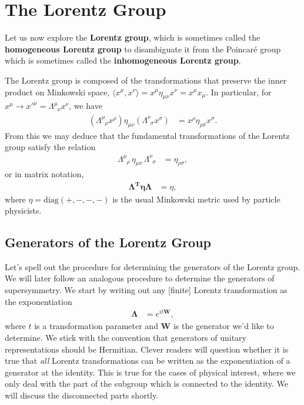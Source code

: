 \section{The Lorentz Group}

Let us now explore the \textbf{Lorentz group}, which is sometimes called the \textbf{homogeneous Lorentz group} to disambiguate it from the Poincar\'e group which is sometimes called the \textbf{inhomogeneous Lorentz group}.

The Lorentz group is composed of the transformations that preserve the inner product on Minkowski space, $\langle x^\mu,x^\nu\rangle = x^\mu \eta_{\mu\nu}x^\nu = x^\mu x_\mu$. In particular, for $x^\mu \rightarrow x'^\mu = \Lambda^{\mu}_{\phantom\mu\nu}x^\nu$, we have
\begin{align}
    \left(\Lambda^\mu_{\phantom\mu\rho}x^\rho\right) \eta_{\mu\nu} \left(\Lambda^{\nu}_{\phantom\nu\sigma}x^\sigma\right) &= x^\rho \eta_{\rho\sigma}x^\sigma.
\end{align}
From this we may deduce that the fundamental transformations of the Lorentz group satisfy the relation
\begin{align}
        \Lambda^\mu_{\phantom\mu\rho}\, \eta_{\mu\nu}\, \Lambda^{\nu}_{\phantom\nu\sigma} &= \eta_{\rho\sigma},\label{eq:SUSYalg:lorentzgroup:indices}
\end{align}
or in matrix notation,
\begin{align}
    \mathbf{\Lambda^T\eta\Lambda} &= \eta,\label{eq:SUSYalg:lorentzgroup}
\end{align}
where $\eta = \text{diag}(+,-,-,-)$ is the usual Minkowski metric used by particle physicists.

\subsection{Generators of the Lorentz Group}

Let's spell out the procedure for determining the generators of the Lorentz group. We will later follow an analogous procedure to determine the generators of supersymmetry. We start by writing out any [finite] Lorentz transformation as the exponentiation
\begin{align}
    \mathbf{\Lambda} &= e^{i t \mathbf{W}},\label{eq:SUSYalg:lorentz:exp}
\end{align}
where $t$ is a transformation parameter and $\mathbf{W}$ is the generator we'd like to determine. We stick with the convention that generators of unitary representations  should be Hermitian. 
%
Clever readers will question whether it is true that \textit{all} Lorentz transformations can be written as the exponentiation of a generator at the identity. This is true for the cases of physical interest, where we only deal with the part of the subgroup which is connected to the identity. We will discuss the disconnected parts shortly.

